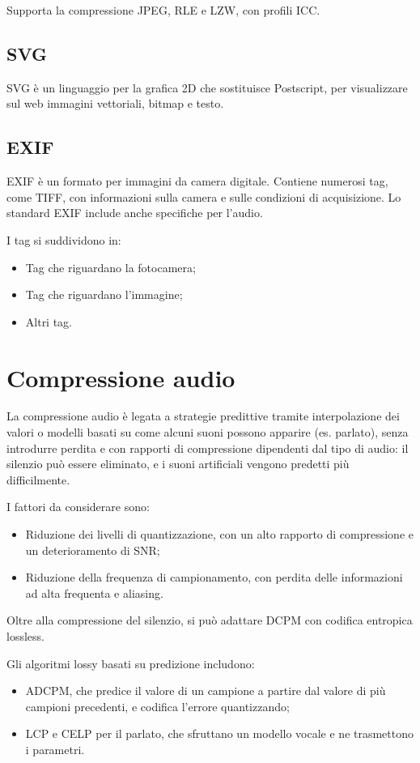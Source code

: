  Supporta la compressione JPEG, RLE e LZW, con profili ICC.
 
 \subsection{SVG}
 SVG è un linguaggio per la grafica 2D che sostituisce Postscript, per visualizzare sul web immagini vettoriali, bitmap e testo.
 
 \subsection{EXIF}
 EXIF è un formato per immagini da camera digitale. Contiene numerosi tag, come TIFF, con informazioni sulla camera e sulle condizioni di acquisizione. Lo standard EXIF include anche specifiche per l'audio.
 
 I tag si suddividono in:
 \begin{itemize}
 	\item Tag che riguardano la fotocamera;
 	\item Tag che riguardano l'immagine;
 	\item Altri tag.
 \end{itemize}
 
 \section{Compressione audio}
 La compressione audio è legata a strategie predittive tramite interpolazione dei valori o modelli basati su come alcuni suoni possono apparire (es. parlato), senza introdurre perdita e con rapporti di compressione dipendenti dal tipo di audio: il silenzio può essere eliminato, e i suoni artificiali vengono predetti più difficilmente.
 
 I fattori da considerare sono:
 \begin{itemize}
 	\item Riduzione dei livelli di quantizzazione, con un alto rapporto di compressione e un deterioramento di SNR;
 	\item Riduzione della frequenza di campionamento, con perdita delle informazioni ad alta frequenta e aliasing.
 \end{itemize}

Oltre alla compressione del silenzio, si può adattare DCPM con codifica entropica lossless.

Gli algoritmi lossy basati su predizione includono:
\begin{itemize}
	\item ADCPM, che predice il valore di un campione a partire dal valore di più campioni precedenti, e codifica l'errore quantizzando;
	\item LCP e CELP per il parlato, che sfruttano un modello vocale e ne trasmettono i parametri.
\end{itemize}
 
